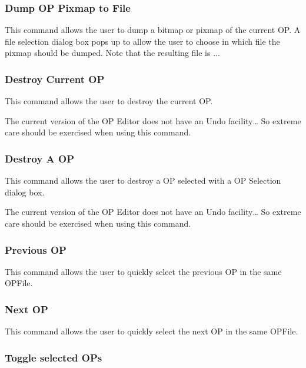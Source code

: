 \subsubsection{Dump OP Pixmap to File}

This command allows the user to dump a bitmap or pixmap of the current OP.  A
file selection dialog box pops up to allow the user to choose in which file the
pixmap should be dumped. Note that the resulting file is ...

\subsubsection{Destroy Current OP}

This command allows the user to destroy the current  OP.

 The current version of the OP Editor does not have an
Undo facility\dots{} So extreme care should be exercised when using this
command.

\subsubsection{Destroy A OP}

This command allows the user to destroy a OP selected with a OP Selection
dialog box.

 The current version of the OP Editor does not have an
Undo facility\dots{} So extreme care should be exercised when using this
command.

\subsubsection{Previous OP}

This command allows the user to quickly select the previous OP in the same
OPFile.

\subsubsection{Next OP}

This command allows the user to quickly select the next OP in the same
OPFile.

\subsubsection{Toggle selected OPs}

